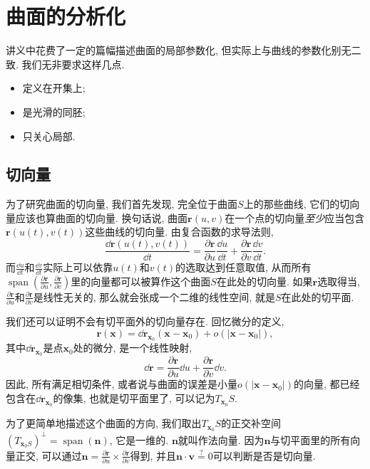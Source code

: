 \documentclass[./main.tex]{subfiles}
\begin{document}
\section{曲面的分析化}
讲义中花费了一定的篇幅描述曲面的局部参数化, 但实际上与曲线的参数化别无二致. 我们无非要求这样几点.
\begin{itemize}
    \item 定义在开集上;
    \item 是光滑的同胚;
    \item 只关心局部.
\end{itemize}
\subsection{切向量}
为了研究曲面的切向量, 我们首先发现, 完全位于曲面\(S\)上的那些曲线, 它们的切向量应该也算曲面的切向量. 换句话说, 曲面\(\mathbf{r}(u,v)\)在一个点的切向量\textit{至少}应当包含\(\mathbf{r}(u(t),v(t))\)这些曲线的切向量. 由复合函数的求导法则,
\[
    \frac{\dd\mathbf{r}(u(t),v(t))}{\dd t}=\frac{\partial\mathbf{r}}{\partial u}\frac{\dd u}{\dd t}+\frac{\partial\mathbf{r}}{\partial v}\frac{\dd v}{\dd t}.
\]
而\(\frac{\dd u}{\dd t}\)和\(\frac{\dd v}{\dd t}\)实际上可以依靠\(u(t)\)和\(v(t)\)的选取达到任意取值, 从而所有\(\operatorname{span}\left(\frac{\partial\mathbf{r}}{\partial u},\frac{\partial\mathbf{r}}{\partial v}\right)\)里的向量都可以被算作这个曲面\(S\)在此处的切向量. 如果\(\mathbf{r}\)选取得当, \(\frac{\partial\mathbf{r}}{\partial u}\)和\(\frac{\partial\mathbf{r}}{\partial v}\)是线性无关的, 那么就会张成一个二维的线性空间, 就是\(S\)在此处的切平面.

我们还可以证明不会有切平面外的切向量存在. 回忆微分的定义,
\[
    \mathbf{r}(\mathbf{x})=\dd\mathbf{r}_{\mathbf{x}_0}(\mathbf{x}-\mathbf{x}_0)+o(|\mathbf{x}-\mathbf{x}_0|),
\]
其中\(\dd\mathbf{r}_{\mathbf{x}_0}\)是点\(\mathbf{x}_0\)处的微分, 是一个线性映射,
\[
    \dd\mathbf{r}=\frac{\partial\mathbf{r}}{\partial u}\dd u+\frac{\partial\mathbf{r}}{\partial v}\dd v.
\]
因此, 所有满足相切条件, 或者说与曲面的误差是小量\(o(|\mathbf{x}-\mathbf{x}_0|)\)的向量, 都已经包含在\(\dd\mathbf{r}_{\mathbf{x}_0}\)的像集, 也就是切平面里了, 可以记为\(T_{\mathbf{x}_0}S\).

为了更简单地描述这个曲面的方向, 我们取出\(T_{\mathbf{x}_0}S\)的正交补空间\((T_{\mathbf{x}_0S})^{\perp}=\operatorname{span}(\mathbf{n})\), 它是一维的. \(\mathbf{n}\)就叫作法向量. 因为\(\mathbf{n}\)与切平面里的所有向量正交, 可以通过\(\mathbf{n}=\frac{\partial\mathbf{r}}{\partial u}\times\frac{\partial\mathbf{r}}{\partial v}\)得到, 并且\(\mathbf{n}\cdot\mathbf{v}\overset{?}{=}0\)可以判断是否是切向量.
\end{document}
